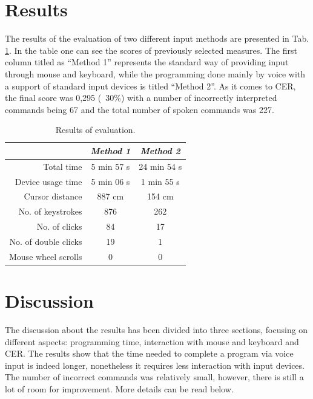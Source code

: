 \section{Results}

The results of the evaluation of two different input methods are presented in Tab. \ref{tab:results}. In the table one can see the scores of previously selected measures. The first column titled as ``Method 1'' represents the standard way of providing input through mouse and keyboard, while the programming done mainly by voice with a support of standard input devices is titled ``Method 2''. 
As it comes to CER, the final score was 0,295 (~30\%) with a number of incorrectly interpreted commands being 67 and the total number of spoken commands was 227. 

\begin{table}
    \caption{Results of evaluation.}
    \label{tab:results}
    \centering
    \setlength{\textwidth}{5mm} %
    \def\arraystretch{1.25} %
    \begin{tabular}{|r||c|c|}
        \hline
        & \emph{Method 1} & \emph{Method 2} \\
        \hline
        \hline
        Total time & 5 min 57 s & 24 min 54 s \\
        \hline
        Device usage time &  5 min 06 s & 1 min 55 s\\
        \hline
        Cursor distance & 887 cm & 154 cm \\
        \hline
        No. of keystrokes & 876 & 262 \\
        \hline
        No. of clicks &  84 & 17  \\
        \hline
        No. of double clicks &  19 & 1\\
        \hline
        Mouse wheel scrolls &  0 & 0\\
        \hline
    \end{tabular}
\end{table}

\section{Discussion}

The discussion about the results has been divided into three sections, focusing on different aspects: programming time, interaction with mouse and keyboard and CER. The results show that the time needed to complete a program via voice input is indeed longer, nonetheless it requires less interaction with input devices. The number of incorrect commands was relatively small, however, there is still a lot of room for improvement. More details can be read below.

